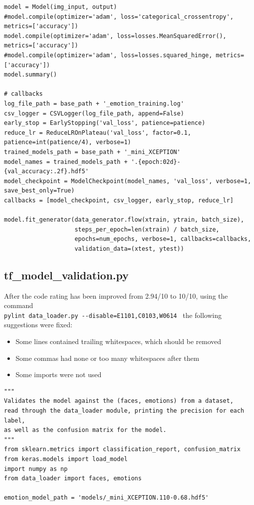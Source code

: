 \documentclass[runningheads,a4paper,11pt]{report}
\begin{document}
\begin{appendices}
\begin{lstlisting}
model = Model(img_input, output)
#model.compile(optimizer='adam', loss='categorical_crossentropy', metrics=['accuracy'])
model.compile(optimizer='adam', loss=losses.MeanSquaredError(), metrics=['accuracy'])
#model.compile(optimizer='adam', loss=losses.squared_hinge, metrics=['accuracy'])
model.summary()

# callbacks
log_file_path = base_path + '_emotion_training.log'
csv_logger = CSVLogger(log_file_path, append=False)
early_stop = EarlyStopping('val_loss', patience=patience)
reduce_lr = ReduceLROnPlateau('val_loss', factor=0.1, patience=int(patience/4), verbose=1)
trained_models_path = base_path + '_mini_XCEPTION'
model_names = trained_models_path + '.{epoch:02d}-{val_accuracy:.2f}.hdf5'
model_checkpoint = ModelCheckpoint(model_names, 'val_loss', verbose=1, save_best_only=True)
callbacks = [model_checkpoint, csv_logger, early_stop, reduce_lr]

model.fit_generator(data_generator.flow(xtrain, ytrain, batch_size),
                    steps_per_epoch=len(xtrain) / batch_size,
                    epochs=num_epochs, verbose=1, callbacks=callbacks,
                    validation_data=(xtest, ytest))
\end{lstlisting}

\clearpage
\subsection{tf\_model\_validation.py}
After the code rating has been improved from 2.94/10 to 10/10, using the command \\
\verb|pylint data_loader.py --disable=E1101,C0103,W0614 | the following suggestions were fixed:
\begin{itemize}
	\item Some lines contained trailing whitespaces, which should be removed
	\item Some commas had none or too many whitespaces after them
	\item Some imports were not used
\end{itemize}
\begin{lstlisting}
"""
Validates the model against the (faces, emotions) from a dataset,
read through the data_loader module, printing the precision for each label,
as well as the confusion matrix for the model.
"""
from sklearn.metrics import classification_report, confusion_matrix
from keras.models import load_model
import numpy as np
from data_loader import faces, emotions

emotion_model_path = 'models/_mini_XCEPTION.110-0.68.hdf5'


\end{lstlisting}
\end{appendices}
\end{document}

